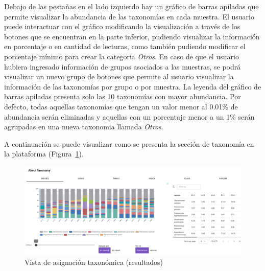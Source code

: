 Debajo de las pestañas en el lado izquierdo hay un gráfico de barras apiladas que permite visualizar la abundancia de las taxonomías en cada muestra.
El usuario puede interactuar con el gráfico modificando la visualización a través de los botones que se encuentran en la parte inferior, pudiendo visualizar la información en porcentaje o en cantidad de lecturas, como también pudiendo modificar el porcentaje mínimo para crear la categoria \textit{Otros}.
En caso de que el usuario hubiera ingresado información de grupos asociados a las muestras, se podrá visualizar un nuevo grupo de botones que permite al usuario visualizar la información de las taxonomías por grupo o por muestra.
La leyenda del gráfico de barras apiladas presenta solo las 10 taxonomías con mayor abundancia. 
Por defecto, todas aquellas taxonomías que tengan un valor menor al 0.01\% de abundancia serán eliminadas y aquellas con un porcentaje menor a un 1\%  serán agrupadas en una nueva taxonomia llamada \textit{Otros}.


A continuación se puede visualizar como se presenta la sección de taxonomía en la plataforma (Figura~\ref{fig:app-results-taxonomy}).

\begin{figure}[H]
    \includegraphics[width=1\linewidth]{images/app/results/taxonomy.png}

    \caption{Vista de asignación taxonómica (resultados)}
    \label{fig:app-results-taxonomy}
\end{figure}


